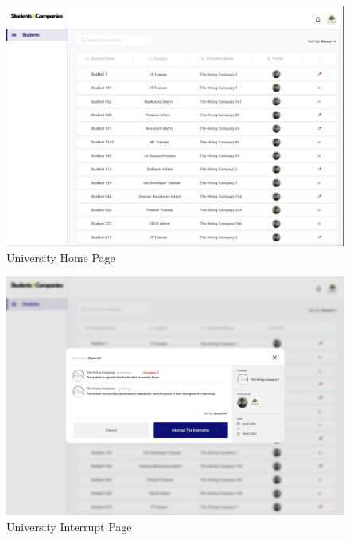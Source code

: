 \documentclass{article}
\begin{document}
\begin{figure}[H]
    \centering
    \includegraphics[scale = 0.40]{figures/UserInterfaces/University/UniversityHomePage.png}
    \caption{University Home Page}
     \centering
\end{figure}
\begin{figure}[H]
    \centering
    \includegraphics[scale = 0.40]{figures/UserInterfaces/University/InterruptPage.png}
    \caption{University Interrupt Page}
     \centering
\end{figure}
\end{document}
